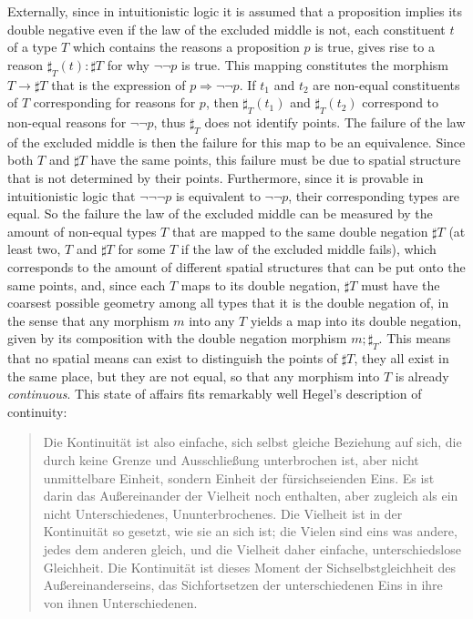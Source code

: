 \documentclass{article}
\begin{document}
Externally, since in intuitionistic logic it is assumed that a proposition implies its double negative even if the law of the excluded middle is not, each constituent $t$ of a type $T$ which contains the reasons a proposition $p$ is true, gives rise to a reason $\sharp_T (t):\sharp T$ for why $\neg\neg p$ is true. This mapping constitutes the morphism $T \rightarrow \sharp T$ that is the expression of $p\Rightarrow\neg\neg p$. If $t_1$ and $t_2$ are non-equal constituents of $T$ corresponding for reasons for $p$, then $\sharp_T (t_1)$ and $\sharp_T (t_2)$ correspond to non-equal reasons for $\neg\neg p$, thus $\sharp_T$ does not identify points. The failure of the law of the excluded middle is then the failure for this map to be an equivalence. Since both $T$ and $\sharp T$ have the same points, this failure must be due to spatial structure that is not determined by their points. Furthermore, since it is provable in intuitionistic logic that $\neg\neg\neg p$ is equivalent to $\neg\neg p$, their corresponding types are equal. So the failure the law of the excluded middle can be measured by the amount of non-equal types $T$ that are mapped to the same double negation $\sharp T$ (at least two, $T$ and $\sharp T$ for some $T$ if the law of the excluded middle fails), which corresponds to the amount of different spatial structures that can be put onto the same points, and, since each $T$ maps to its double negation, $\sharp T$ must have the coarsest possible geometry among all types that it is the double negation of, in the sense that any morphism $m$ into any $T$ yields a map into its double negation, given by its composition with the double negation morphism $m;\sharp_T$. This means that no spatial means can exist to distinguish the points of $\sharp T$, they all exist in the same place, but they are not equal, so that any morphism into $T$ is already \emph{continuous}. This state of affairs fits remarkably well Hegel's description of continuity:

\begin{quote}
    Die Kontinuität ist also einfache, sich selbst gleiche Beziehung auf sich, die durch keine Grenze und Ausschließung unterbrochen ist, aber nicht unmittelbare Einheit, sondern Einheit der fürsichseienden Eins. Es ist darin das Außereinander der Vielheit noch enthalten, aber zugleich als ein nicht Unterschiedenes, Ununterbrochenes. Die Vielheit ist in der Kontinuität so gesetzt, wie sie an sich ist; die Vielen sind eins was andere, jedes dem anderen gleich, und die Vielheit daher einfache, unterschiedslose Gleichheit. Die Kontinuität ist dieses Moment der Sichselbstgleichheit des Außereinanderseins, das Sichfortsetzen der unterschiedenen Eins in ihre von ihnen Unterschiedenen.
\end{quote}
\end{document}
